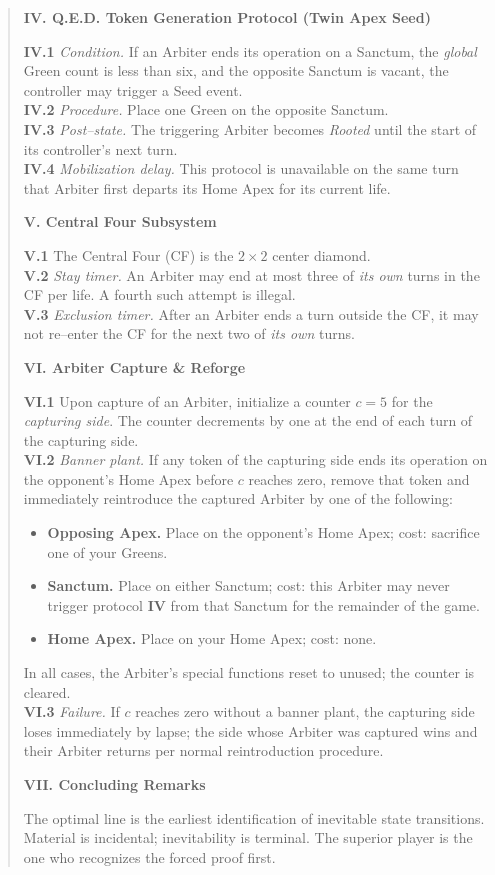\documentclass[11pt]{article}
\begin{document}
\begin{quote}
\medskip
\textbf{IV. Q.E.D. Token Generation Protocol (Twin Apex Seed)}

\textbf{IV.1} \textit{Condition.} If an Arbiter ends its operation on a Sanctum, the \emph{global} Green count is less than six, and the opposite Sanctum is vacant, the controller may trigger a Seed event.\\
\textbf{IV.2} \textit{Procedure.} Place one Green on the opposite Sanctum.\\
\textbf{IV.3} \textit{Post--state.} The triggering Arbiter becomes \emph{Rooted} until the start of its controller’s next turn.\\
\textbf{IV.4} \textit{Mobilization delay.} This protocol is unavailable on the same turn that Arbiter first departs its Home Apex for its current life.

\medskip
\textbf{V. Central Four Subsystem}

\textbf{V.1} The Central Four (CF) is the $2\times2$ center diamond.\\
\textbf{V.2} \textit{Stay timer.} An Arbiter may end at most three of \emph{its own} turns in the CF per life. A fourth such attempt is illegal.\\
\textbf{V.3} \textit{Exclusion timer.} After an Arbiter ends a turn outside the CF, it may not re--enter the CF for the next two of \emph{its own} turns.

\medskip
\textbf{VI. Arbiter Capture \& Reforge}

\textbf{VI.1} Upon capture of an Arbiter, initialize a counter $c=5$ for the \emph{capturing side}. The counter decrements by one at the end of each turn of the capturing side.\\
\textbf{VI.2} \textit{Banner plant.} If any token of the capturing side ends its operation on the opponent’s Home Apex before $c$ reaches zero, remove that token and immediately reintroduce the captured Arbiter by one of the following:
\begin{itemize}\itemsep0.2em
  \item \textbf{Opposing Apex.} Place on the opponent’s Home Apex; cost: sacrifice one of your Greens.
  \item \textbf{Sanctum.} Place on either Sanctum; cost: this Arbiter may never trigger protocol \textbf{IV} from that Sanctum for the remainder of the game.
  \item \textbf{Home Apex.} Place on your Home Apex; cost: none.
\end{itemize}
In all cases, the Arbiter’s special functions reset to unused; the counter is cleared.\\
\textbf{VI.3} \textit{Failure.} If $c$ reaches zero without a banner plant, the capturing side loses immediately by lapse; the side whose Arbiter was captured wins and their Arbiter returns per normal reintroduction procedure.

\medskip
\textbf{VII. Concluding Remarks}

The optimal line is the earliest identification of inevitable state transitions. Material is incidental; inevitability is terminal. The superior player is the one who recognizes the forced proof first.
\end{quote}
\end{document}
